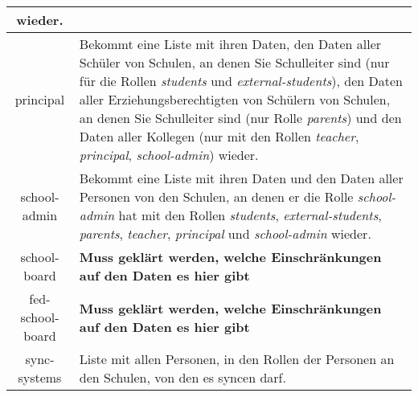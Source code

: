 \begin{longtable}{|c|p{}|}
					wieder.\\ \hline
principal & Bekommt eine Liste mit ihren Daten,
            den Daten aller Schüler von Schulen, an denen Sie Schulleiter sind (nur für die Rollen \textit{students} und \textit{external-students}),
						den Daten aller Erziehungsberechtigten von Schülern von Schulen, an denen Sie Schulleiter sind (nur Rolle \textit{parents}) und
					  den Daten aller Kollegen (nur mit den Rollen \textit{teacher}, \textit{principal}, \textit{school-admin})
						wieder.\\ \hline
school-admin & Bekommt eine Liste mit ihren Daten und
               den Daten aller Personen von den Schulen, an denen er die Rolle \textit{school-admin} hat mit den Rollen \textit{students}, \textit{external-students}, \textit{parents}, \textit{teacher}, \textit{principal} und \textit{school-admin} wieder.  \\ \hline
school-board & \textcolor[rgb]{1,0.41,0.13}{\textbf{Muss geklärt werden, welche Einschränkungen auf den Daten es hier gibt}} \\ \hline
fed-school-board & \textcolor[rgb]{1,0.41,0.13}{\textbf{Muss geklärt werden, welche Einschränkungen auf den Daten es hier gibt}} \\ \hline
sync-systems & Liste mit allen Personen, in den Rollen der Personen an den Schulen, von den es syncen darf. \\ \hline

	\end{longtable}
